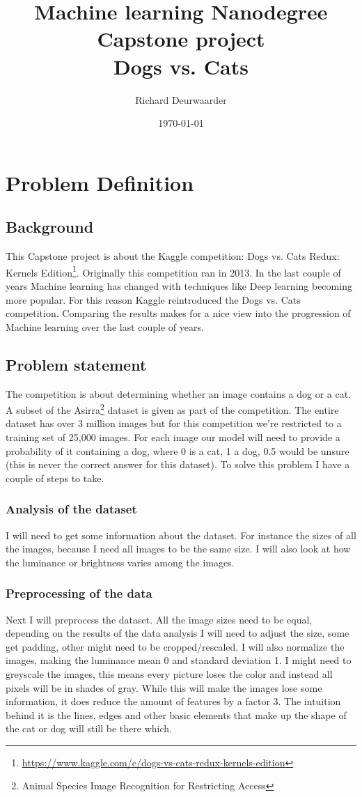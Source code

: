 \documentclass[11pt]{article}
\title{\textbf{Machine learning Nanodegree\\ Capstone project}\\ Dogs vs. Cats}
\author{Richard Deurwaarder}
\date{\today}
\begin{document}
\maketitle

\section{Problem	 Definition}

\subsection{Background}
This Capstone project is about the Kaggle competition: Dogs vs. Cats Redux: Kernels Edition\footnote{\url{https://www.kaggle.com/c/dogs-vs-cats-redux-kernels-edition}}. Originally this competition ran in 2013. In the last couple of years Machine learning has changed with techniques like Deep learning becoming more popular. For this reason Kaggle reintroduced the Dogs vs. Cats competition. Comparing the results makes for a nice view into the progression of Machine learning over the last couple of years.
\subsection{Problem statement}
The competition is about determining whether an image contains a dog or a cat. A subset of the Asirra\footnote{Animal Species Image Recognition for Restricting Access} dataset is given as part of the competition. The entire dataset has over 3 million images but for this competition we're restricted to a training set of 25,000 images. For each image our model will need to provide a probability of it containing a dog, where 0 is a cat, 1 a dog, 0.5 would be unsure (this is never the correct answer for this dataset). To solve this problem I have a couple of steps to take.
\pagebreak
\subsubsection{Analysis of the dataset}
I will need to get some information about the dataset. For instance the sizes of all the images, because I need all images to be the same size. I will also look at how the luminance or brightness varies among the images.
\subsubsection{Preprocessing of the data}
Next I will preprocess the dataset. All the image sizes need to be equal, depending on the results of the data analysis I will need to adjust the size, some get padding, other might need to be cropped/rescaled. I will also normalize the images, making the luminance mean 0 and standard deviation 1. I might need to greyscale the images, this means every picture loses the color and instead all pixels will be in shades of gray. While this will make the images lose some information, it does reduce the amount of features by a factor 3. The intuition behind it is the lines, edges and other basic elements that make up the shape of the cat or dog will still be there which.
\end{document}

